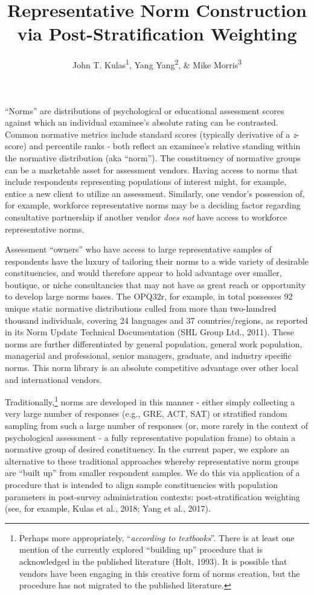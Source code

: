 \documentclass[
  ,man]{apa7}
\title{Representative Norm Construction via Post-Stratification Weighting}
\author{John T. Kulas\textsuperscript{1}, Yang Yang\textsuperscript{2}, \& Mike Morris\textsuperscript{3}}
\date{}
\affiliation{\vspace{0.5cm}\textsuperscript{1} Montclair State University\\\textsuperscript{2} China Select\\\textsuperscript{3} CPP Inc}
\begin{document}
\maketitle

``Norms'' are distributions of psychological or educational assessment scores against which an individual examinee's absolute rating can be contrasted. Common normative metrics include standard scores (typically derivative of a \emph{z}-score) and percentile ranks - both reflect an examinee's relative standing within the normative distribution (aka ``norm''). The constituency of normative groups can be a marketable asset for assessment vendors. Having access to norms that include respondents representing populations of interest might, for example, entice a new client to utilize an assessment. Similarly, one vendor's possession of, for example, workforce representative norms may be a deciding factor regarding consultative partnership if another vendor \emph{does not} have access to workforce representative norms.

Assessment ``owners'' who have access to large representative samples of respondents have the luxury of tailoring their norms to a wide variety of desirable constituencies, and would therefore appear to hold advantage over smaller, boutique, or niche consultancies that may not have as great reach or opportunity to develop large norms bases. The OPQ32r, for example, in total possesses 92 unique static normative distributions culled from more than two-hundred thousand individuals, covering 24 languages and 37 countries/regions, as reported in its Norm Update Technical Documentation (SHL Group Ltd., 2011). These norms are further differentiated by general population, general work population, managerial and professional, senior managers, graduate, and industry specific norms. This norm library is an absolute competitive advantage over other local and international vendors.

Traditionally,\footnote{Perhaps more appropriately, ``\emph{according to textbooks}''. There is at least one mention of the currently explored ``building up'' procedure that is acknowledged in the published literature (Holt, 1993). It is possible that vendors have been engaging in this creative form of norms creation, but the procedure has not migrated to the published literature.} norms are developed in this manner - either simply collecting a very large number of responses (e.g., GRE, ACT, SAT) or stratified random sampling from such a large number of responses (or, more rarely in the context of psychological assessment - a fully representative population frame) to obtain a normative group of desired constituency. In the current paper, we explore an alternative to these traditional approaches whereby representative norm groups are ``built up'' from smaller respondent samples. We do this via application of a procedure that is intended to align sample constituencies with population parameters in post-survey administration contexts: post-stratification weighting (see, for example, Kulas et al., 2018; Yang et al., 2017).
\end{document}
